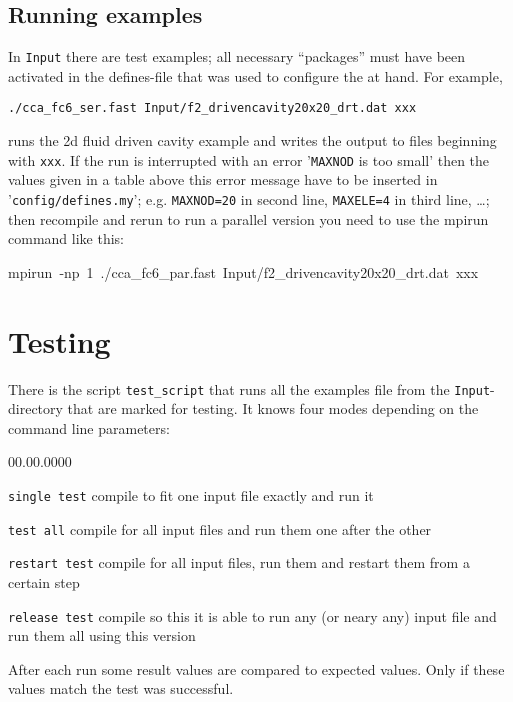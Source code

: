 \subsection{Running examples}\label{beginner:sec:running-examples}

In \texttt{Input} there are test examples; all necessary ``packages''
must have been activated in the defines-file that was used to configure
the \ccarat{} at hand. For example,

\texttt{./cca\_fc6\_ser.fast Input/f2\_drivencavity20x20\_drt.dat xxx }

runs the 2d fluid driven cavity example and writes the output to files
beginning with \texttt{xxx}. If the run is interrupted with an error
'\texttt{MAXNOD} is too small' then the values given in a table above
this error message have to be inserted in '\texttt{config/defines.my}';
e.g. \texttt{MAXNOD=20} in second line, \texttt{MAXELE=4} in third
line, \ldots; then recompile and rerun to run a parallel version you
need to use the mpirun command like this:

\begin{lyxcode}
mpirun~-np~1~./cca\_fc6\_par.fast~Input/f2\_drivencavity20x20\_drt.dat~xxx
\end{lyxcode}

\section{Testing}

There is the script \texttt{test\_script} that runs all the examples
file from the \texttt{Input}-directory that are marked for testing.
It knows four modes depending on the command line parameters:

\begin{lyxlist}{00.00.0000}
\item [{\texttt{single~test}}] compile \ccarat{} to fit one input file
exactly and run it
\item [{\texttt{test~all}}] compile \ccarat{} for all input files and
run them one after the other
\item [{\texttt{restart~test}}] compile \ccarat{} for all input files,
run them and restart them from a certain step
\item [{\texttt{release~test}}] compile \ccarat{} so this it is able
to run any (or neary any) input file and run them all using this version
\end{lyxlist}
After each run some result values are compared to expected values.
Only if these values match the test was successful.

